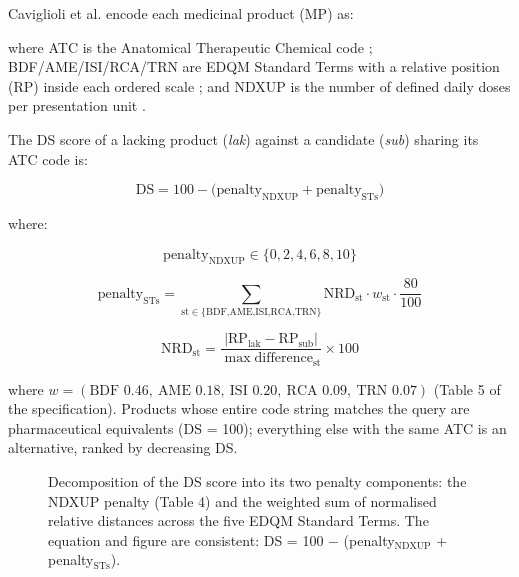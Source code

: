 \documentclass[12pt,twocolumn,a4paper]{elsarticle}
\begin{document}
Caviglioli et al.\citep{caviglioli2025medicine} encode each medicinal product (MP) as:


where ATC is the Anatomical Therapeutic Chemical code \citep{who2026atcddd}; BDF/AME/ISI/RCA/TRN are EDQM Standard Terms with a relative position (RP) inside each ordered scale \citep{edqm2024standard,iso202311239}; and NDXUP is the number of defined daily doses per presentation unit \citep{who2026atcddd}.

The DS score of a lacking product (\emph{lak}) against a candidate (\emph{sub}) sharing its ATC code is:

\begin{equation}
\text{DS} = 100 - \bigl(\text{penalty}_{\text{NDXUP}} + \text{penalty}_{\text{STs}}\bigr)
\label{eq:ds}
\end{equation}

where:

\begin{equation}
\text{penalty}_{\text{NDXUP}} \in \{0,2,4,6,8,10\}
\label{eq:ndxup}
\end{equation}

\begin{equation}
\text{penalty}_{\text{STs}} = \sum_{\text{st}\in\{\text{BDF,AME,ISI,RCA,TRN}\}} \text{NRD}_{\text{st}} \cdot w_{\text{st}} \cdot \frac{80}{100}
\label{eq:st}
\end{equation}

\begin{equation}
\text{NRD}_{\text{st}} = \frac{|\text{RP}_{\text{lak}} - \text{RP}_{\text{sub}}|}{\max\text{difference}_{\text{st}}} \times 100
\label{eq:nrd}
\end{equation}

where $w = (\text{BDF }0.46,\ \text{AME }0.18,\ \text{ISI }0.20,\ \text{RCA }0.09,\ \text{TRN }0.07)$ (Table 5 of the specification). Products whose entire code string matches the query are pharmaceutical equivalents (DS = 100); everything else with the same ATC is an alternative, ranked by decreasing DS.

\begin{figure}[htbp]
\centering
\resizebox{\columnwidth}{!}{%
%
}
\caption{Decomposition of the DS score into its two penalty components: the NDXUP penalty (Table 4) and the weighted sum of normalised relative distances across the five EDQM Standard Terms. The equation and figure are consistent: DS = 100 $-$ (penalty$_{\text{NDXUP}}$ + penalty$_{\text{STs}}$).}
\label{fig:ds-formula}
\end{figure}
\end{document}
